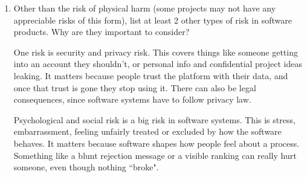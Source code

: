 \documentclass{article}
\begin{document}
\begin{enumerate}
    \item Other than the risk of physical harm (some projects may not have any
    appreciable risks of this form), list at least 2 other types of risk in
    software products. Why are they important to consider?

    One risk is security and privacy risk.
    This covers things like someone getting into an account they shouldn’t, or personal info and
    confidential project ideas leaking. It matters because people trust the platform with their data,
    and once that trust is gone they stop using it. There can also be legal consequences,
    since software systems have to follow privacy law.

    Psychological and social risk is a big risk in software systems.
    This is stress, embarrassment, feeling unfairly treated or excluded by how the software behaves.
    It matters because software shapes how people feel about a process. Something like a blunt rejection message
    or a visible ranking can really hurt someone, even though nothing “broke".

\end{enumerate}
\end{document}
